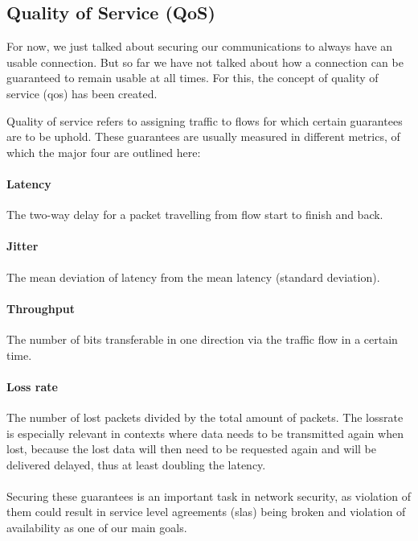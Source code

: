 \subsection{Quality of Service (QoS)}
For now, we just talked about securing our communications to always have an usable connection. But so far we have not talked about how a connection can be guaranteed to remain usable at all times. For this, the concept of quality of service (\acrshort{qos}) has been created.

Quality of service \cite{qos, rfc791} refers to assigning traffic to flows for which certain guarantees are to be uphold. These guarantees are usually measured in different metrics, of which the major four are outlined here:

\paragraph{Latency} The two-way delay for a packet travelling from flow start to finish and back.

\paragraph{Jitter} The mean deviation of \gls{latency} from the mean \gls{latency} (standard deviation).

\paragraph{Throughput} The number of bits transferable in one direction via the traffic flow in a certain time.

\paragraph{Loss rate} The number of lost packets divided by the total amount of packets. The \gls{lossrate} is especially relevant in contexts where data needs to be transmitted again when lost, because the lost data will then need to be requested again and will be delivered delayed, thus at least doubling the \gls{latency}.

\paragraph{}Securing these guarantees is an important task in network security, as violation of them could result in service level agreements (\acrshort{sla}s) being broken and violation of availability as one of our main goals.

